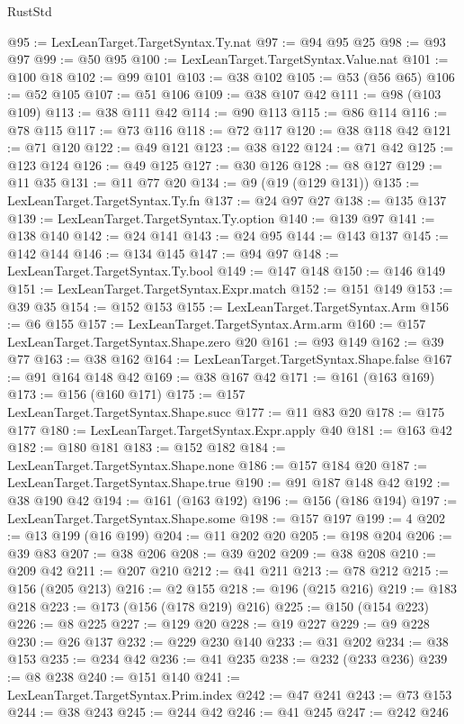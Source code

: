 \begin{lexlean}{RustStd}
\begin{coremodule}
@95 := LexLeanTarget.TargetSyntax.Ty.nat
@97 := @94 @95 @25
@98 := @93 @97
@99 := @50 @95
@100 := LexLeanTarget.TargetSyntax.Value.nat
@101 := @100 @18
@102 := @99 @101
@103 := @38 @102
@105 := @53 (@56 @65)
@106 := @52 @105
@107 := @51 @106
@109 := @38 @107 @42
@111 := @98 (@103 @109)
@113 := @38 @111 @42
@114 := @90 @113
@115 := @86 @114
@116 := @78 @115
@117 := @73 @116
@118 := @72 @117
@120 := @38 @118 @42
@121 := @71 @120
@122 := @49 @121
@123 := @38 @122
@124 := @71 @42
@125 := @123 @124
@126 := @49 @125
@127 := @30 @126
@128 := @8 @127
@129 := @11 @35
@131 := @11 @77 @20
@134 := @9 (@19 (@129 @131))
@135 := LexLeanTarget.TargetSyntax.Ty.fn
@137 := @24 @97 @27
@138 := @135 @137
@139 := LexLeanTarget.TargetSyntax.Ty.option
@140 := @139 @97
@141 := @138 @140
@142 := @24 @141
@143 := @24 @95
@144 := @143 @137
@145 := @142 @144
@146 := @134 @145
@147 := @94 @97
@148 := LexLeanTarget.TargetSyntax.Ty.bool
@149 := @147 @148
@150 := @146 @149
@151 := LexLeanTarget.TargetSyntax.Expr.match
@152 := @151 @149
@153 := @39 @35
@154 := @152 @153
@155 := LexLeanTarget.TargetSyntax.Arm
@156 := @6 @155
@157 := LexLeanTarget.TargetSyntax.Arm.arm
@160 := @157 LexLeanTarget.TargetSyntax.Shape.zero @20
@161 := @93 @149
@162 := @39 @77
@163 := @38 @162
@164 := LexLeanTarget.TargetSyntax.Shape.false
@167 := @91 @164 @148 @42
@169 := @38 @167 @42
@171 := @161 (@163 @169)
@173 := @156 (@160 @171)
@175 := @157 LexLeanTarget.TargetSyntax.Shape.succ
@177 := @11 @83 @20
@178 := @175 @177
@180 := LexLeanTarget.TargetSyntax.Expr.apply @40
@181 := @163 @42
@182 := @180 @181
@183 := @152 @182
@184 := LexLeanTarget.TargetSyntax.Shape.none
@186 := @157 @184 @20
@187 := LexLeanTarget.TargetSyntax.Shape.true
@190 := @91 @187 @148 @42
@192 := @38 @190 @42
@194 := @161 (@163 @192)
@196 := @156 (@186 @194)
@197 := LexLeanTarget.TargetSyntax.Shape.some
@198 := @157 @197
@199 := 4
@202 := @13 @199 (@16 @199)
@204 := @11 @202 @20
@205 := @198 @204
@206 := @39 @83
@207 := @38 @206
@208 := @39 @202
@209 := @38 @208
@210 := @209 @42
@211 := @207 @210
@212 := @41 @211
@213 := @78 @212
@215 := @156 (@205 @213)
@216 := @2 @155
@218 := @196 (@215 @216)
@219 := @183 @218
@223 := @173 (@156 (@178 @219) @216)
@225 := @150 (@154 @223)
@226 := @8 @225
@227 := @129 @20
@228 := @19 @227
@229 := @9 @228
@230 := @26 @137
@232 := @229 @230 @140
@233 := @31 @202
@234 := @38 @153
@235 := @234 @42
@236 := @41 @235
@238 := @232 (@233 @236)
@239 := @8 @238
@240 := @151 @140
@241 := LexLeanTarget.TargetSyntax.Prim.index
@242 := @47 @241
@243 := @73 @153
@244 := @38 @243
@245 := @244 @42
@246 := @41 @245
@247 := @242 @246

\end{coremodule}
\end{lexlean}
